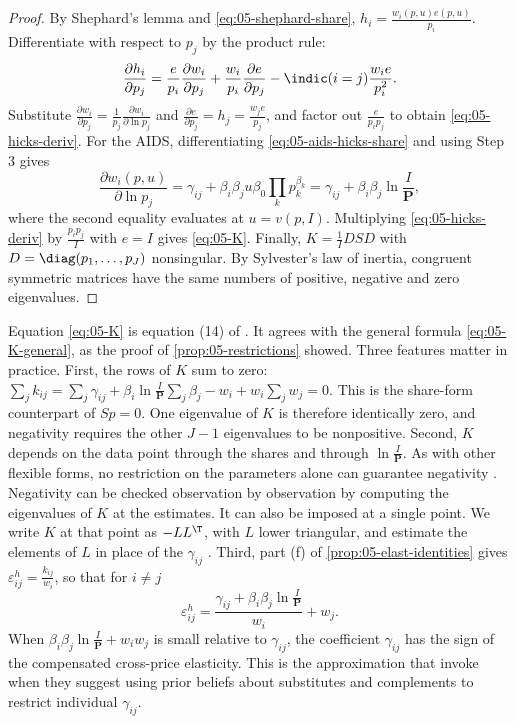 \begin{proof}
By Shephard's lemma and \eqref{eq:05-shephard-share}, $h_i = \frac{w_i(p,u)e(p,u)}{p_i}$. Differentiate with
respect to $p_j$ by the product rule:
\begin{equation*}
\frac{\partial h_i}{\partial p_j} = \frac{e}{p_i}\frac{\partial w_i}{\partial p_j} + \frac{w_i}{p_i}
\frac{\partial e}{\partial p_j} - \indic(i=j)\frac{w_ie}{p_i^2} .
\end{equation*}
Substitute $\frac{\partial w_i}{\partial p_j} = \frac{1}{p_j}\frac{\partial w_i}{\partial\ln p_j}$ and
$\frac{\partial e}{\partial p_j} = h_j = \frac{w_je}{p_j}$, and factor out $\frac{e}{p_ip_j}$ to obtain
\eqref{eq:05-hicks-deriv}. For the AIDS, differentiating \eqref{eq:05-aids-hicks-share} and using Step 3 gives
\begin{equation*}
\frac{\partial w_i(p, u)}{\partial\ln p_j} = \gamma_{ij} + \beta_i\beta_ju\beta_0\prod_kp_k^{\beta_k}
= \gamma_{ij} + \beta_i\beta_j\ln\frac{I}{\mathbf{P}} ,
\end{equation*}
where the second equality evaluates at $u = v(p, I)$. Multiplying \eqref{eq:05-hicks-deriv} by
$\frac{p_ip_j}{I}$ with $e = I$ gives \eqref{eq:05-K}. Finally, $K = \frac{1}{I}DSD$ with
$D = \diag(p_1, \dots, p_J)$ nonsingular. By Sylvester's law of inertia, congruent symmetric matrices have
the same numbers of positive, negative and zero eigenvalues.
\end{proof}

Equation \eqref{eq:05-K} is equation (14) of \citet[p.~316]{DeatonMuellbauer1980a}. It agrees with the
general formula \eqref{eq:05-K-general}, as the proof of \cref{prop:05-restrictions} showed. Three features
matter in practice. First, the rows of $K$ sum to zero:
$\sum_jk_{ij} = \sum_j\gamma_{ij} + \beta_i\ln\frac{I}{\mathbf{P}}\sum_j\beta_j - w_i + w_i\sum_jw_j = 0$. This is the share-form
counterpart of $Sp = 0$. One eigenvalue of $K$ is therefore identically zero, and negativity requires the
other $J - 1$ eigenvalues to be nonpositive. Second, $K$ depends on the data point through the shares and
through $\ln\frac{I}{\mathbf{P}}$. As with other flexible forms, no restriction on the parameters alone can
guarantee negativity \citep[p.~316]{DeatonMuellbauer1980a}. Negativity can be checked observation by
observation by computing the eigenvalues of $K$ at the estimates. It can also be imposed at a single point. We
write $K$ at that point as $-LL^\T$, with $L$ lower triangular, and estimate the elements of $L$ in place of
the $\gamma_{ij}$ \citep{Lau1978,Moschini1999}. Third, part (f) of \cref{prop:05-elast-identities} gives
$\varepsilon^h_{ij} = \frac{k_{ij}}{w_i}$, so that for $i \neq j$
\begin{equation}\label{eq:05-gamma-sign}
\varepsilon^h_{ij} = \frac{\gamma_{ij} + \beta_i\beta_j\ln\frac{I}{\mathbf{P}}}{w_i} + w_j .
\end{equation}
When $\beta_i\beta_j\ln\frac{I}{\mathbf{P}} + w_iw_j$ is small relative to $\gamma_{ij}$, the coefficient
$\gamma_{ij}$ has the sign of the compensated cross-price elasticity. This is the approximation that
\citet[p.~315]{DeatonMuellbauer1980a} invoke when they suggest using prior beliefs about substitutes and
complements to restrict individual $\gamma_{ij}$.

